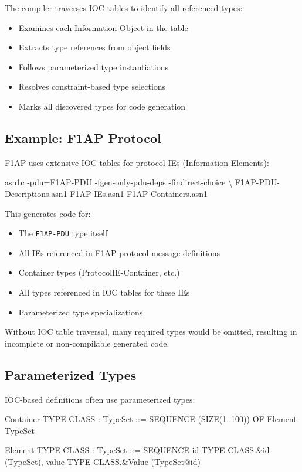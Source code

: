 \documentclass[english,oneside,12pt]{book}
\begin{document}
The compiler traverses IOC tables to identify all referenced types:

\begin{itemize}
\item Examines each Information Object in the table
\item Extracts type references from object fields
\item Follows parameterized type instantiations
\item Resolves constraint-based type selections
\item Marks all discovered types for code generation
\end{itemize}

\subsection*{Example: F1AP Protocol}

F1AP uses extensive IOC tables for protocol IEs (Information Elements):

\begin{bash}
asn1c -pdu=F1AP-PDU -fgen-only-pdu-deps -findirect-choice \textbackslash
      F1AP-PDU-Descriptions.asn1 F1AP-IEs.asn1 F1AP-Containers.asn1
\end{bash}

This generates code for:
\begin{itemize}
\item The \texttt{F1AP-PDU} type itself
\item All IEs referenced in F1AP protocol message definitions
\item Container types (ProtocolIE-Container, etc.)
\item All types referenced in IOC tables for these IEs
\item Parameterized type specializations
\end{itemize}

Without IOC table traversal, many required types would be omitted, resulting in 
incomplete or non-compilable generated code.

\subsection*{Parameterized Types}

IOC-based definitions often use parameterized types:

\begin{asn}
Container { TYPE-CLASS : TypeSet } ::= SEQUENCE (SIZE(1..100)) OF
    Element { {TypeSet} }

Element { TYPE-CLASS : TypeSet } ::= SEQUENCE {
    id      TYPE-CLASS.&id      ({TypeSet}),
    value   TYPE-CLASS.&Value   ({TypeSet}{@id})
}
\end{asn}
\end{document}

